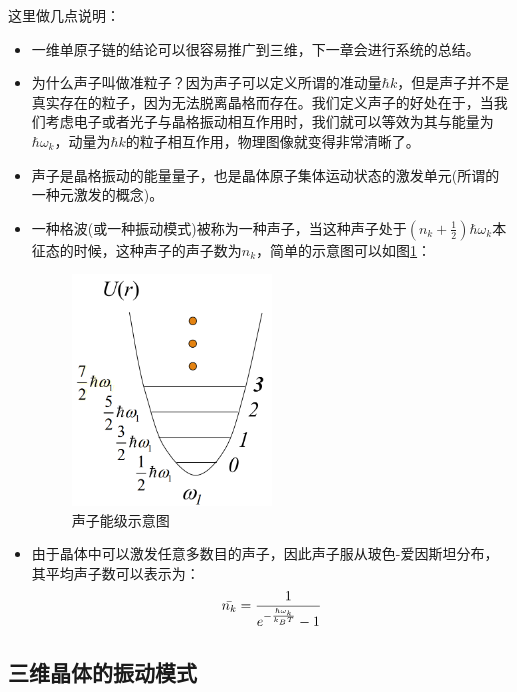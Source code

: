 \documentclass{ctexart}
\begin{document}
            这里做几点说明：
            \begin{itemize}
                \item 一维单原子链的结论可以很容易推广到三维，下一章会进行系统的总结。
                \item 为什么声子叫做准粒子？因为声子可以定义所谓的准动量$\hbar k$，但是声子并不是真实存在的粒子，因为无法脱离晶格而存在。我们定义声子的好处在于，当我们考虑电子或者光子与晶格振动相互作用时，我们就可以等效为其与能量为$\hbar\omega_k$，动量为$\hbar k$的粒子相互作用，物理图像就变得非常清晰了。
                \item 声子是晶格振动的能量量子，也是晶体原子集体运动状态的激发单元(所谓的一种元激发的概念)。
                \item 一种格波(或一种振动模式)被称为一种声子，当这种声子处于$(n_k+\frac{1}{2})\hbar \omega_k$本征态的时候，这种声子的声子数为$n_k$，简单的示意图可以如图\ref{fig:phonon}：
                \begin{figure}[H]
                    \centering
                    \includegraphics[width=0.5\textwidth]{figure/声子.png}
                    \caption{声子能级示意图}
                    \label{fig:phonon}
                \end{figure}
                \item 由于晶体中可以激发任意多数目的声子，因此声子服从玻色-爱因斯坦分布，其平均声子数可以表示为：
                \begin{equation}
                    \Bar{n_k}=\frac{1}{e^{-\frac{\hbar\omega_k}{k_BT}}-1}
                \end{equation}
            \end{itemize}
            
            \subsection{三维晶体的振动模式}
            
\end{document}
